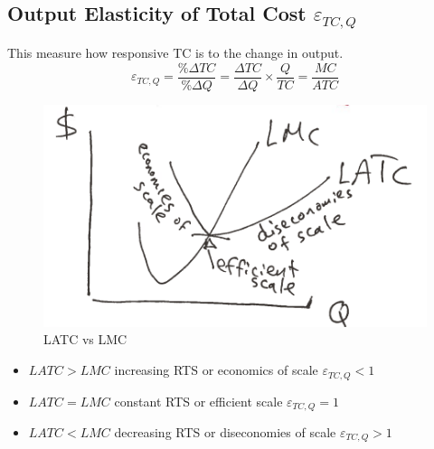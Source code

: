 \documentclass[../ECON-281-Notes.tex]{subfiles}
\begin{document}
\subsection{Output Elasticity of Total Cost \(\varepsilon_{TC,Q}\)}
This measure how responsive TC is to the change in output.
\begin{equation}
    \varepsilon_{TC,Q} = \frac{\%\Delta TC}{\% \Delta Q} = \frac{\Delta TC}{\Delta Q} \times \frac{Q}{TC} = \frac{MC}{ATC} 
\end{equation}


\begin{figure}[h]
    \centering
    \includegraphics[width=\columnwidth]{../assets/LR_RTS.png}   
    \caption{LATC vs LMC}
    \label{fig:LATC_LMC}
\end{figure}

\begin{itemize}
    \item \(LATC > LMC\) increasing RTS or economics of scale \(\varepsilon_{TC,Q} < 1\)
    \item \(LATC = LMC\) constant RTS or efficient scale \(\varepsilon_{TC,Q} = 1\)
    \item \(LATC < LMC\) decreasing RTS or diseconomies of scale \(\varepsilon_{TC,Q} > 1\)
\end{itemize}
\end{document}
